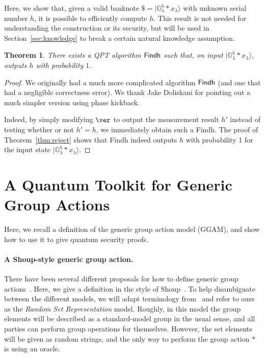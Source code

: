 \documentclass{article}\usepackage[a4paper,margin=20mm]{geometry}
\newtheorem{theorem}{Theorem}\newtheorem{lemma}[theorem]{Lemma}\newtheorem{proposition}[theorem]{Proposition}\newtheorem{corollary}[theorem]{Corollary}\newtheorem{definition}[theorem]{Definition}\newtheorem{claim}[theorem]{Claim}\newtheorem{remark}[theorem]{Remark}\newtheorem{observation}[theorem]{Observation}\newtheorem{conjecture}[theorem]{Conjecture}\newtheorem{example}[theorem]{Example}
\numberwithin{theorem}{section}
\numberwithin{equation}{section}
\newcommand{\G}{\mathbb{G}}
\begin{document}
Here, we show that, given a valid banknote $\$=|\G_\lambda^h*x_\lambda\rangle$ with unknown serial number $h$, it is possible to efficiently compute $h$. This result is not needed for understanding the construction or its security, but will be used in Section~\ref{sec:knowledge} to break a certain natural knowledge assumption.

\begin{theorem}\label{thm:computeh} There exists a QPT algorithm ${\sf Findh}$ such that, on input $|\G_\lambda^h*x_\lambda\rangle$, outputs $h$ with probability $1$.
\end{theorem}
\begin{proof} We originally had a much more complicated algorithm ${\sf Findh}$ (and one that had a negligible correctness error). We thank Jake Doliskani for pointing out a much simpler version using phase kickback. 
	
	Indeed, by simply modifying $\ver$ to output the measurement result $h'$ instead of testing whether or not $h'=h$, we immediately obtain such a {\sf Findh}. The proof of Theorem~\ref{thm:reject} shows that {\sf Findh} indeed outputs $h$ with probability 1 for the input state $|\G_\lambda^h*x_\lambda\rangle$.
\end{proof}










\section{A Quantum Toolkit for Generic Group Actions}\label{sec:ggam}

Here, we recall a definition of the generic group action model (GGAM), and show how to use it to give quantum security proofs.

\paragraph{A Shoup-style generic group action.} There have been several different proposals for how to define generic group actions~\cite{DBLP:journals/joc/MontgomeryZ24,PKC:DHKKLR23,EC:BonGuaZha23,EPRINT:OrsZan23}. Here, we give a definition in the style of Shoup~\cite{EC:Shoup97}. To help disambiguate between the different models, we will adapt terminology from~\cite{C:Zhandry22b} and refer to ours as the \emph{Random Set Representation} model. Roughly, in this model the group elements will be described as a standard-model group in the usual sense, and all parties can perform group operations for themselves. However, the set elements will be given as random strings, and the only way to perform the group action $*$ is using an oracle.
\end{document}
